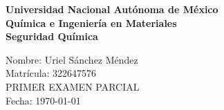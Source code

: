 \documentclass[12pt]{article}
\begin{document}
\begin{titlepage}
\thispagestyle{empty}
\begin{center}
\vspace*{2cm}
\fontsize{14}{30}\selectfont\textbf{Universidad Nacional Autónoma de México} \\
\vspace{1cm}
\fontsize{14}{30}\selectfont\textbf{Química e Ingeniería en Materiales} \\
\vspace{1cm}
\fontsize{14}{30}\selectfont\textbf{Seguridad Química} \\
\end{center}
\vspace{2cm}
\begin{flushright}
    \fontsize{14}{30}\selectfont
        \hspace{2cm} Nombre: Uriel Sánchez Méndez \\
        \hspace{2cm} Matrícula: 322647576 \\
        \hspace{2cm} PRIMER EXAMEN PARCIAL \\
        \hspace{2cm} Fecha: \today \\
\end{flushright}
\end{titlepage}

\tableofcontents
\thispagestyle{empty}
\newpage



\end{document}
